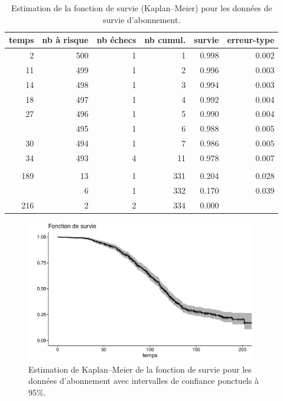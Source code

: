 \documentclass[
  11pt,
  letterpaper,
]{scrbook}
\theoremstyle{definition}
\theoremstyle{remark}
\begin{document}
\hypertarget{tbl-survie1-tableau}{}
\begin{table}
\caption{\label{tbl-survie1-tableau}Estimation de la fonction de survie (Kaplan--Meier) pour les données de
survie d'abonnement. }\tabularnewline

\centering
\begin{tabular}{rrrrrr}
\toprule
temps & nb à risque & nb échecs & nb cumul. & survie & erreur-type\\
\midrule
2 & 500 & 1 & 1 & 0.998 & 0.002\\
11 & 499 & 1 & 2 & 0.996 & 0.003\\
14 & 498 & 1 & 3 & 0.994 & 0.003\\
18 & 497 & 1 & 4 & 0.992 & 0.004\\
27 & 496 & 1 & 5 & 0.990 & 0.004\\
\addlinespace
29 & 495 & 1 & 6 & 0.988 & 0.005\\
30 & 494 & 1 & 7 & 0.986 & 0.005\\
34 & 493 & 4 & 11 & 0.978 & 0.007\\
 &  &  &  &  & \\
189 & 13 & 1 & 331 & 0.204 & 0.028\\
\addlinespace
202 & 6 & 1 & 332 & 0.170 & 0.039\\
216 & 2 & 2 & 334 & 0.000 & \\
\bottomrule
\end{tabular}
\end{table}

\begin{figure}[ht!]

{\centering \includegraphics[width=0.9\textwidth,height=\textheight]{survie_files/figure-pdf/fig-km-survie1-1.pdf}

}

\caption{\label{fig-km-survie1}Estimation de Kaplan--Meier de la
fonction de survie pour les données d'abonnement avec intervalles de
confiance ponctuels à 95\%.}

\end{figure}
\end{document}
